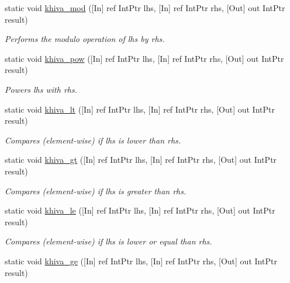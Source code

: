\begin{DoxyCompactItemize}
static void \mbox{\hyperlink{classkhiva_1_1interop_1_1_d_l_l_array_ab4a8e192211b2df1f8699640b9b113b1}{khiva\+\_\+mod}} (\mbox{[}In\mbox{]} ref Int\+Ptr lhs, \mbox{[}In\mbox{]} ref Int\+Ptr rhs, \mbox{[}Out\mbox{]} out Int\+Ptr result)
\begin{DoxyCompactList}\small\item\em Performs the modulo operation of lhs by rhs.\end{DoxyCompactList}\item 
static void \mbox{\hyperlink{classkhiva_1_1interop_1_1_d_l_l_array_a8f77d606bc6f4d309f4d780f7ebacc46}{khiva\+\_\+pow}} (\mbox{[}In\mbox{]} ref Int\+Ptr lhs, \mbox{[}In\mbox{]} ref Int\+Ptr rhs, \mbox{[}Out\mbox{]} out Int\+Ptr result)
\begin{DoxyCompactList}\small\item\em Powers lhs with rhs.\end{DoxyCompactList}\item 
static void \mbox{\hyperlink{classkhiva_1_1interop_1_1_d_l_l_array_abd5288ae8182d3f23a15ddd790b06ea5}{khiva\+\_\+lt}} (\mbox{[}In\mbox{]} ref Int\+Ptr lhs, \mbox{[}In\mbox{]} ref Int\+Ptr rhs, \mbox{[}Out\mbox{]} out Int\+Ptr result)
\begin{DoxyCompactList}\small\item\em Compares (element-\/wise) if lhs is lower than rhs.\end{DoxyCompactList}\item 
static void \mbox{\hyperlink{classkhiva_1_1interop_1_1_d_l_l_array_a3ef02ed8d73c45dcc4dff13579567bdf}{khiva\+\_\+gt}} (\mbox{[}In\mbox{]} ref Int\+Ptr lhs, \mbox{[}In\mbox{]} ref Int\+Ptr rhs, \mbox{[}Out\mbox{]} out Int\+Ptr result)
\begin{DoxyCompactList}\small\item\em Compares (element-\/wise) if lhs is greater than rhs.\end{DoxyCompactList}\item 
static void \mbox{\hyperlink{classkhiva_1_1interop_1_1_d_l_l_array_a7b810d44a1482760ade3b4f930078452}{khiva\+\_\+le}} (\mbox{[}In\mbox{]} ref Int\+Ptr lhs, \mbox{[}In\mbox{]} ref Int\+Ptr rhs, \mbox{[}Out\mbox{]} out Int\+Ptr result)
\begin{DoxyCompactList}\small\item\em Compares (element-\/wise) if lhs is lower or equal than rhs.\end{DoxyCompactList}\item 
static void \mbox{\hyperlink{classkhiva_1_1interop_1_1_d_l_l_array_ac77b65893e98b262b6398022e9dd54e6}{khiva\+\_\+ge}} (\mbox{[}In\mbox{]} ref Int\+Ptr lhs, \mbox{[}In\mbox{]} ref Int\+Ptr rhs, \mbox{[}Out\mbox{]} out Int\+Ptr result)

\end{DoxyCompactItemize}
